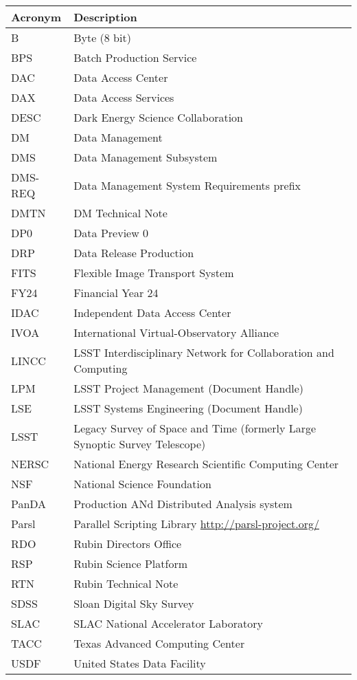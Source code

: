 \addtocounter{table}{-1}
\begin{longtable}{p{}p{}}\hline
\textbf{Acronym} & \textbf{Description}  \\\hline

B & Byte (8 bit) \\\hline
BPS & Batch Production Service \\\hline
DAC & Data Access Center \\\hline
DAX & Data Access Services \\\hline
DESC & Dark Energy Science Collaboration \\\hline
DM & Data Management \\\hline
DMS & Data Management Subsystem \\\hline
DMS-REQ & Data Management System Requirements prefix \\\hline
DMTN & DM Technical Note \\\hline
DP0 & Data Preview 0 \\\hline
DRP & Data Release Production \\\hline
FITS & Flexible Image Transport System \\\hline
FY24 & Financial Year 24 \\\hline
IDAC & Independent Data Access Center \\\hline
IVOA & International Virtual-Observatory Alliance \\\hline
LINCC & LSST Interdisciplinary Network for Collaboration and Computing \\\hline
LPM & LSST Project Management (Document Handle) \\\hline
LSE & LSST Systems Engineering (Document Handle) \\\hline
LSST & Legacy Survey of Space and Time (formerly Large Synoptic Survey Telescope) \\\hline
NERSC & National Energy Research Scientific Computing Center \\\hline
NSF & National Science Foundation \\\hline
PanDA &  Production ANd Distributed Analysis system \\\hline
Parsl & Parallel Scripting Library \url{http://parsl-project.org/} \\\hline
RDO & Rubin Directors Office \\\hline
RSP & Rubin Science Platform \\\hline
RTN & Rubin Technical Note \\\hline
SDSS & Sloan Digital Sky Survey \\\hline
SLAC & SLAC National Accelerator Laboratory \\\hline
TACC & Texas Advanced Computing Center \\\hline
USDF & United States Data Facility \\\hline
\end{longtable}
